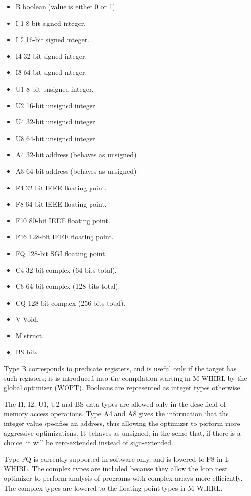 \documentclass{article}
\begin{document}
\begin{itemize}
\item B boolean (value is either 0 or 1) 
\item I 1 8-bit signed integer. 
\item I 2 16-bit signed integer.
\item I4 32-bit signed integer. 
\item I8 64-bit signed integer.
\item U1 8-bit unsigned integer. 
\item U2 16-bit unsigned integer. 
\item U4 32-bit unsigned integer. 
\item U8 64-bit unsigned integer. 
\item A4 32-bit address (behaves as unsigned). 
\item A8 64-bit address (behaves as unsigned).
\item F4 32-bit IEEE floating point. 
\item F8 64-bit IEEE floating point. 
\item F10 80-bit IEEE floating point. 
\item F16 128-bit IEEE floating point.
\item FQ 128-bit SGI floating point.
\item C4 32-bit complex (64 bits total). 
\item C8 64-bit complex (128 bits total). 
\item CQ 128-bit complex (256 bits total).
\item V Void. 
\item M struct. 
\item BS bits.
\end{itemize}

Type B corresponds to predicate registers, and is useful only if
the target has such registers; it is introduced into the compilation
starting in M WHIRL by the global optimizer (WOPT). Booleans are
represented as integer types otherwise.

The I1, I2, U1, U2 and BS data types are allowed only in the desc
field of memory access operations. Type A4 and A8 gives the information
that the integer value specifies an address, thus allowing the
optimizer to perform more aggressive optimizations. It behaves as
unsigned, in the sense that, if there is a choice, it will be
zero-extended instead of sign-extended.

Type FQ is currently supported in software only, and is lowered to
F8 in L WHIRL. The complex types are included because they allow
the loop nest optimizer to perform analysis of programs with complex
arrays more efficiently. The complex types are lowered to the floating
point types in M WHIRL.
\end{document}
